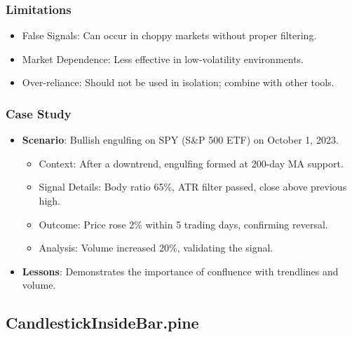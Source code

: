 \documentclass[12pt]{article}
\begin{document}
\subsubsection{Limitations}
\begin{itemize}
\item False Signals: Can occur in choppy markets without proper filtering.
\item Market Dependence: Less effective in low-volatility environments.
\item Over-reliance: Should not be used in isolation; combine with other tools.
\end{itemize}

\subsubsection{Case Study}
\begin{itemize}
\item \textbf{Scenario}: Bullish engulfing on SPY (S\&P 500 ETF) on October 1, 2023.
  \begin{itemize}
  \item Context: After a downtrend, engulfing formed at 200-day MA support.
  \item Signal Details: Body ratio 65\%, ATR filter passed, close above previous high.
  \item Outcome: Price rose 2\% within 5 trading days, confirming reversal.
  \item Analysis: Volume increased 20\%, validating the signal.
  \end{itemize}
\item \textbf{Lessons}: Demonstrates the importance of confluence with trendlines and volume.
\end{itemize}

\subsection{CandlestickInsideBar.pine}
\label{subsec:insidebar}
\end{document}
